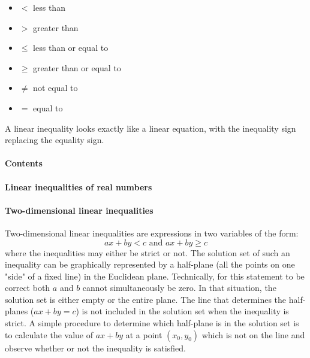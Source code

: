 \begin{itemize}
    \item $<$ less than
    \item $>$ greater than
    \item $\leq$ less than or equal to
    \item $\geq$ greater than or equal to
    \item $\neq$ not equal to
    \item $=$ equal to
\end{itemize}

A linear inequality looks exactly like a linear equation, with the inequality sign replacing the equality sign.



\paragraph{Contents}





\paragraph{Linear inequalities of real numbers}



\paragraph{Two-dimensional linear inequalities}







Two-dimensional linear inequalities are expressions in two variables of the form:
$$
a x + b y < c \text{ and } a x + b y \geq c
$$
where the inequalities may either be strict or not. The solution set of such an inequality can be graphically represented by a half-plane (all the points on one "side" of a fixed line) in the Euclidean plane. Technically, for this statement to be correct both $a$ and $b$ cannot simultaneously be zero. In that situation, the solution set is either empty or the entire plane. The line that determines the half-planes ($a x + b y = c$) is not included in the solution set when the inequality is strict. A simple procedure to determine which half-plane is in the solution set is to calculate the value of $a x + b y$ at a point $(x_0, y_0)$ which is not on the line and observe whether or not the inequality is satisfied.



